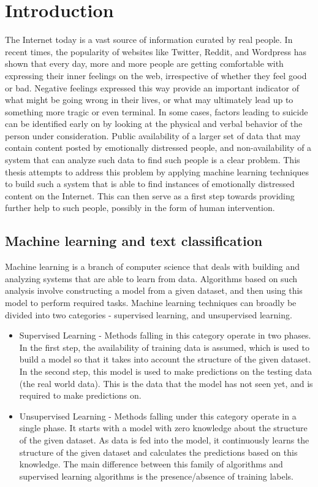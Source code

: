 \chapter{Introduction}
\label{chapter:Introduction}

The Internet today is a vast source of information curated by real people. In recent times, the popularity of websites like Twitter, Reddit, and Wordpress has shown that every day, more and more people are getting comfortable with expressing their inner feelings on the web, irrespective of whether they feel good or bad. Negative feelings expressed this way provide an important indicator of what might be going wrong in their lives, or what may ultimately lead up to something more tragic or even terminal. In some cases, factors leading to suicide can be identified early on by looking at the physical and verbal behavior of the person under consideration. Public availability of a larger set of data that may contain content posted by emotionally distressed people, and non-availability of a system that can analyze such data to find such people is a clear problem. This thesis attempts to address this problem by applying machine learning techniques to build such a system that is able to find instances of emotionally distressed content on the Internet. This can then serve as a first step towards providing further help to such people, possibly in the form of human intervention.

\section{Machine learning and text classification}
Machine learning is a branch of computer science that deals with building and analyzing systems that are able to learn from data. Algorithms based on such analysis involve constructing a model from a given dataset, and then using this model to perform required tasks. Machine learning techniques can broadly be divided into two categories - supervised learning, and unsupervised learning.

\begin{itemize}
    \item{
    Supervised Learning - Methods falling in this category operate in two phases. In the first step, the availability of training data is assumed, which is used to build a model so that it takes into account the structure of the given dataset. In the second step, this model is used to make predictions on the testing data (the real world data). This is the data that the model has not seen yet, and is required to make predictions on.
    }
    \item{
    Unsupervised Learning - Methods falling under this category operate in a single phase. It starts with a model with zero knowledge about the structure of the given dataset. As data is fed into the model, it continuously learns the structure of the given dataset and calculates the predictions based on this knowledge. The main difference between this family of algorithms and supervised learning algorithms is the presence/absence of training labels.
    }
\end{itemize}

